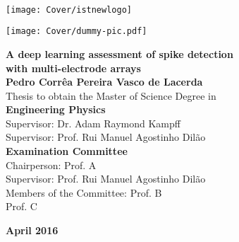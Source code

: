 \setcounter{page}{1} 


\thispagestyle{empty}
\begin{flushleft} ~\\ \vspace{-12mm} \hspace{-12mm}  \texttt{[image: Cover/istnewlogo]} 
\vspace{10mm}
\\ \begin{center} \texttt{[image: Cover/dummy-pic.pdf]}  \end{center} %
 \vspace{5mm}
\centering
\LARGE \textbf{A deep learning assessment of spike detection \\ with multi-electrode arrays}
\\ \vspace{10mm}
\Large \textbf{Pedro Corrêa Pereira Vasco de Lacerda} \\
\vspace{12mm}
\large Thesis to obtain the Master of Science Degree in
\\ \vspace{2mm}
\LARGE \textbf{Engineering Physics}
\\ \vspace{10mm}
\large Supervisor: Dr. Adam Raymond Kampff \\
\large Supervisor: Prof. Rui Manuel Agostinho Dilão
\\ \vspace{15mm}
\Large \textbf{Examination Committee}
\\ \vspace{5mm}
\large Chairperson:	Prof. A \\
\large Supervisor: Prof. Rui Manuel Agostinho Dilão \\
\large Members of the Committee: Prof. B \\
Prof. C
 
\vspace{15mm}

\Large \textbf{April 2016} \\
\let\thepage\relax
\end{flushleft}
\pagebreak


\clearpage

\thispagestyle{empty}
\cleardoublepage

\setcounter{page}{1} 

\baselineskip 18pt %
